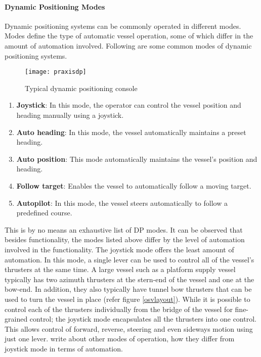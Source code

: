 \paragraph{Dynamic Positioning Modes}
Dynamic positioning systems can be commonly operated in different modes. Modes define the type of automatic vessel operation, some of which differ in the amount of automation involved. Following are some common modes of dynamic positioning systems. 

\begin{figure}
	\centering
	\texttt{[image: praxisdp]}
	\caption{Typical dynamic positioning console}
	\label{fig:praxisdp}
\end{figure}

\begin{enumerate}

\item \textbf{Joystick}: In this mode, the operator can control the vessel position and heading manually using a joystick. 
\item \textbf{Auto heading}: In this mode, the vessel automatically maintains a preset heading. 
\item \textbf{Auto position}: This mode automatically maintains the vessel's position and heading. 
\item \textbf{Follow target}: Enables the vessel to automatically follow a moving target. 
\item \textbf{Autopilot}: In this mode, the vessel steers automatically to follow a predefined course. 

\end{enumerate}

This is by no means an exhaustive list of DP modes. It can be observed that besides functionality, the modes listed above differ by the level of automation involved in the functionality. The joystick mode offers the least amount of automation. In this mode, a single lever can be used to control all of the vessel's thrusters at the same time. A large vessel such as a platform supply vessel typically has two azimuth thrusters at the stern-end of the vessel and one at the bow-end. In addition, they also typically have tunnel bow thrusters that can be used to turn the vessel in place (refer figure \ref{osvlayout}). While it is possible to control each of the thrusters individually from the bridge of the vessel for fine-grained control; the joystick mode encapsulates all the thrusters into one control. This allows control of forward, reverse, steering and even sideways motion using just one lever. \todo[inline]write about other modes of operation, how they differ from joystick mode in terms of automation. 

